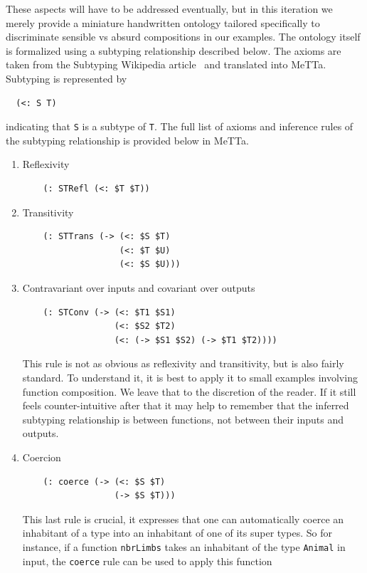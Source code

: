 \documentclass[]{report}
\begin{document}
These aspects will have to be addressed eventually, but in this
iteration we merely provide a miniature handwritten ontology tailored
specifically to discriminate sensible vs absurd compositions in our
examples.  The ontology itself is formalized using a subtyping
relationship described below.  The axioms are taken from the Subtyping
Wikipedia article~\cite{enwiki:1292323950} and translated into MeTTa.
Subtyping is represented by
\begin{verbatim}
  (<: S T)
\end{verbatim}
indicating that \texttt{S} is a subtype of
\texttt{T}.  The full list of axioms and inference rules
of the subtyping relationship is provided below in MeTTa.
\begin{enumerate}
\item Reflexivity
  \begin{verbatim}
    (: STRefl (<: $T $T))
  \end{verbatim}
\item Transitivity
  \begin{verbatim}
    (: STTrans (-> (<: $S $T)
                   (<: $T $U)
                   (<: $S $U)))
  \end{verbatim}
\item Contravariant over inputs and covariant over outputs
  \begin{verbatim}
    (: STConv (-> (<: $T1 $S1)
                  (<: $S2 $T2)
                  (<: (-> $S1 $S2) (-> $T1 $T2))))
  \end{verbatim}
  This rule is not as obvious as reflexivity and transitivity, but is
  also fairly standard.  To understand it, it is best to apply it to
  small examples involving function composition.  We leave that to the
  discretion of the reader.  If it still feels counter-intuitive after
  that it may help to remember that the inferred subtyping
  relationship is between functions, not between their inputs and
  outputs.
\item Coercion
  \begin{verbatim}
    (: coerce (-> (<: $S $T)
                  (-> $S $T)))
  \end{verbatim}
  This last rule is crucial, it expresses that one can automatically
  coerce an inhabitant of a type into an inhabitant of one of its
  super types.  So for instance, if a function
  \texttt{nbrLimbs} takes an inhabitant of the type
  \texttt{Animal} in input, the
  \texttt{coerce} rule can be used to apply this function

\end{enumerate}
\end{document}
